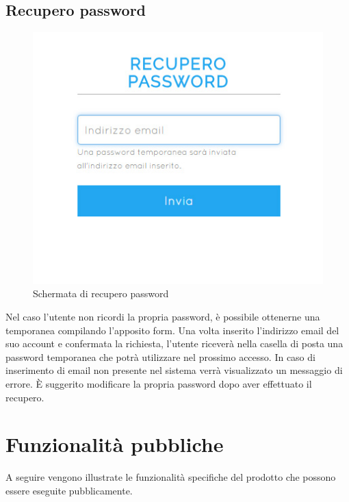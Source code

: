 \documentclass[a4paper, titlepage]{article}
\begin{document}
	\subsection{Recupero password}
	\begin{figure}[!h]
		\centering
		\includegraphics[scale=0.5]{Img/screen_RecuperoPwd.png}
		\caption{Schermata di recupero password}
	\end{figure}
	Nel caso l'utente non ricordi la propria password, è possibile ottenerne una temporanea compilando l'apposito form. Una volta inserito l'indirizzo email del suo account e confermata la richiesta, l'utente riceverà nella casella di posta una password temporanea che potrà utilizzare nel prossimo accesso. In caso di inserimento di email non presente nel sistema verrà visualizzato un messaggio di errore. È suggerito modificare la propria password dopo aver effettuato il recupero.
	
	
	\newpage
	\section{Funzionalità pubbliche}
		A seguire vengono illustrate le funzionalità specifiche del prodotto che possono essere eseguite pubblicamente.
		
\end{document}
